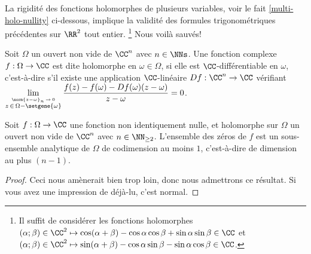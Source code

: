 La rigidité des fonctions holomorphes de plusieurs variables, voir le fait \ref{multi-holo-nullity} ci-dessous, implique la validité des formules trigonométriques précédentes sur $\RR^2$ tout entier.%
\footnote{
	Il suffit de considérer les fonctions holomorphes
	$(\alpha ; \beta) \in \CC^2 \mapsto \cos(\alpha + \beta) - \cos \alpha \cos \beta + \sin \alpha \sin \beta \in \CC$
	et
	$(\alpha ; \beta) \in \CC^2 \mapsto \sin(\alpha + \beta) - \cos \alpha \sin \beta - \sin \alpha \cos \beta \in \CC$.
}
Nous voilà sauvés!


\begin{definition*}
    Soit $\Omega$ un ouvert non vide de $\CC^n$ avec $n \in \NNs$.
	Une fonction complexe $f: \Omega \rightarrow \CC$ est dite holomorphe en $\omega \in \Omega$, 
	si elle est $\CC$-différentiable en $\omega$,
	c'est-à-dire s'il existe une application $\CC$-linéaire $Df: \CC^n \rightarrow \CC$
	vérifiant
	$\displaystyle \lim_{\stackrel{\norm{z - \omega}_n \, \rightarrow \, 0}{z \, \in \, \Omega - \setgene{\omega}}} \frac{f(z) - f(\omega) - Df(\omega) (z - \omega)}{z - \omega} = 0$.
\end{definition*}


\begin{fact} \label{multi-holo-nullity}
    Soit $f: \Omega \rightarrow \CC$ une fonction non identiquement nulle, et holomorphe sur $\Omega$ un ouvert non vide de $\CC^n$ avec $n \in \NN_{\geq 2}$.
	L'ensemble des zéros de $f$ est un sous-ensemble analytique de $\Omega$ de codimension au moins $1$, c'est-à-dire de dimension au plus $(n-1)$.
\end{fact}


\begin{proof}
	Ceci nous amènerait bien trop loin, donc nous admettrons ce résultat. Si vous avez une impression de déjà-lu, c'est normal.
\end{proof}
